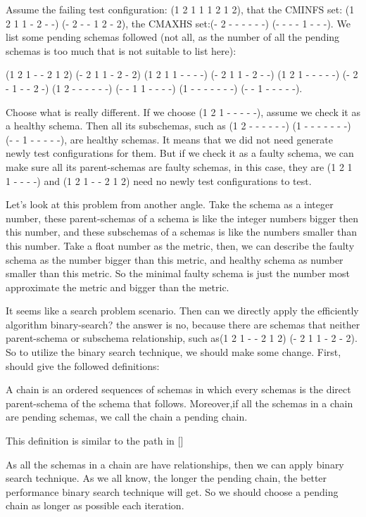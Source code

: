 \documentclass[10pt,journal,cspaper,compsoc]{IEEEtran}
\begin{document}
Assume the failing test configuration: (1 2 1 1 1 2 1 2), that the CMINFS set: (1 2 1 1 - 2 - -) (- 2 - - 1 2 - 2), the CMAXHS set:(- 2 - - - - - -) (- - - - 1 - - -). We list some pending schemas followed (not all, as the number of all the pending schemas is too much that is not suitable to list here):

(1 2 1 - - 2 1 2) (- 2 1 1 - 2 - 2) (1 2 1 1 - - - -) (- 2 1 1 - 2 - -) (1 2 1 - - - - -) (- 2 - 1 - - 2 -) (1 2 - - - - - -) (- - 1 1 - - - -) (1 - - - - - - -)  (- - 1 - - - - -).

Choose what is really different. If we choose (1 2 1 - - - - -), assume we check it as a healthy schema. Then all its subschemas, such as (1 2 - - - - - -) (1 - - - - - - -)  (- - 1 - - - - -), are healthy schemas. It means that we did not need generate newly test configurations for them. But if we check it as a faulty schema, we can make sure all its parent-schemas are faulty schemas, in this case, they are (1 2 1 1 - - - -) and (1 2 1 - - 2 1 2) need no newly test configurations to test.

Let's look at this problem from another angle. Take the schema as a integer number, these parent-schemas of a schema is like the integer numbers bigger then this number, and these subschemas of a schemas is like the numbers smaller than this number. Take a float number as the metric, then, we can describe the faulty schema as the number bigger than this metric, and healthy schema as number smaller than this metric. So the minimal faulty schema is just the number most approximate the metric and bigger than the metric.

It seems like a search problem scenario. Then can we directly apply the efficiently algorithm binary-search? the answer is no, because there are schemas that neither parent-schema or subschema relationship, such as(1 2 1 - - 2 1 2) (- 2 1 1 - 2 - 2). So to utilize the binary search technique, we should make some change. First, should give the followed definitions:

\begin{definition}[chain]
A chain is an ordered sequences of schemas in which every schemas is the direct parent-schema of the schema that follows. Moreover,if all the schemas in a chain are pending schemas, we call the chain a pending chain.
\end{definition}
This definition is similar to the path in []

As all the schemas in a chain are have relationships, then we can apply binary search technique. As we all know, the longer the pending chain, the better performance binary search technique will get. So we should choose a pending chain as longer as possible each iteration.
\end{document}
